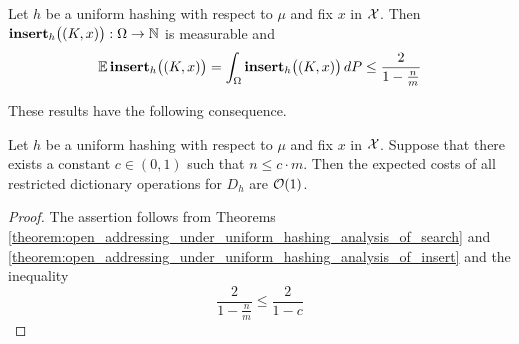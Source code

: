 \begin{theorem}\label{theorem:open_addressing_under_uniform_hashing_analysis_of_insert}
Let $h$ be a uniform hashing with respect to $\mu$ and fix $x$ in ${\mathcal X}$. Then $\mathbf{insert}_h\big((K,x)\big):\Omega \rightarrow {\mathbb N}$ is measurable and
$$\mathbb{E}\,\mathbf{insert}_h\big((K,x)\big) = \int_{\Omega}\mathbf{insert}_h\big((K,x)\big)\,dP \leq \frac{2}{1 - \frac{n}{m}}$$    
\end{theorem}
\noindent
These results have the following consequence.

\begin{corollary}\label{corollary:constant_expected_costs_of_restricted_dictionary_operations_for_uniform_hashing}
Let $h$ be a uniform hashing with respect to $\mu$ and fix $x$ in ${\mathcal X}$. Suppose that there exists a constant $c\in (0,1)$ such that $n\leq c\cdot m$. Then the expected costs of all restricted dictionary operations for $D_h$ are ${\mathcal O}(1)$.
\end{corollary}
\begin{proof}
The assertion follows from Theorems \ref{theorem:open_addressing_under_uniform_hashing_analysis_of_search} and \ref{theorem:open_addressing_under_uniform_hashing_analysis_of_insert} and the inequality 
$$\frac{2}{1 - \frac{n}{m}} \leq \frac{2}{1 - c}$$
\end{proof}




















\small



